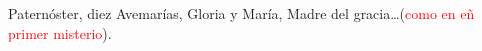 Paternóster, diez Avemarías, Gloria y María, Madre del gracia\ldots\space(\textcolor{red}{como en eñ primer misterio}).